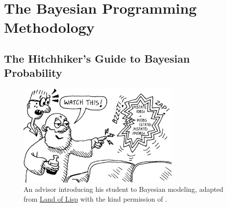 \section{The Bayesian Programming Methodology}

\subsection{The Hitchhiker's Guide to Bayesian Probability}
\begin{figure}[h]
\centering
\includegraphics[width=8cm]{images/zapBayes3.png}
\caption{An advisor introducing his student to Bayesian modeling, adapted from \underline{Land of Lisp} with the kind permission of \cite{LoL}.}
\end{figure}


